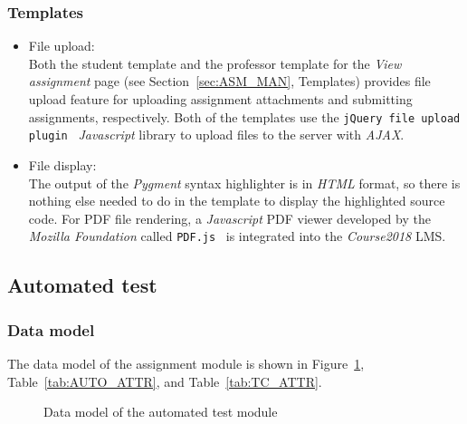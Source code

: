 \subsubsection{Templates}
\begin{itemize}
    \item File upload: \\
        Both the student template and the professor template for the
        \emph{View assignment} page (see Section~\ref{sec:ASM_MAN}, Templates)
        provides file upload feature for uploading
        assignment attachments and submitting assignments, respectively.
        Both of the templates use the
        \texttt{jQuery file upload plugin}~\citep[Section Description]{jqFileUpload}
        \emph{Javascript} library to upload files to the server with
        \emph{AJAX}.
    \item File display: \\
        The output of the \emph{Pygment} syntax highlighter is in \emph{HTML}
        format, so there is nothing else needed to do in the template to
        display the highlighted source code.
        For PDF file rendering, a \emph{Javascript} PDF viewer developed
        by the \emph{Mozilla Foundation} called \texttt{PDF.js}~\cite{pdfjs}
        is integrated into the \emph{Course2018} LMS.
\end{itemize}

\FloatBarrier





\subsection{Automated test}
\label{sec:AUTO_TEST}

\subsubsection{Data model}
The data model of the assignment module is shown in
Figure~\ref{fig:AUTO_ER}, Table~\ref{tab:AUTO_ATTR},
and Table~\ref{tab:TC_ATTR}. \bigskip

\begin{figure}[ht]
    \centering
    \usetikzlibrary{er}


    \caption{Data model of the automated test module}
    \label{fig:AUTO_ER}
\end{figure}

